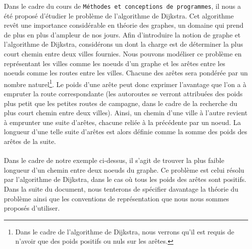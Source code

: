 
Dans le cadre du cours de \texttt{Méthodes et conceptions de programmes}, il nous a été proposé d'étudier le problème de l'algorithme de Dijkstra. Cet algorithme revêt une importance considérable en théorie des graphes, un domaine qui prend de plus en plus d'ampleur de nos jours. Afin d'introduire la notion de graphe et l'algorithme de Dijkstra, considérons un  dont la charge est de déterminer la plus court chemin entre deux villes fournies. Nous pouvons modéliser ce problème en représentant les villes comme les noeuds d'un graphe et les arêtes entre les noeuds comme les routes entre les villes. Chacune des arêtes sera pondérée par un nombre naturel\footnote{Dans le cadre de l'algorithme de Dijkstra, nous verrons qu'il est requis de n'avoir que des poids positifs ou nuls sur les arêtes.}. Le poids d'une arête peut donc exprimer l'avantage que l'on a à empruter la route correspondante (les autoroutes se verront attribuées des poids plus petit que les petites routes de campagne, dans le cadre de la recherche du plus court chemin entre deux villes). Ainsi, un chemin d'une ville à l'autre revient à emprunter une suite d'arêtes, chacune reliée à la précédente par un noeud. La longueur d'une telle suite d'arêtes est alors définie comme la somme des poids des arêtes de la suite.

\paragraph{}
Dans le cadre de notre exemple ci-dessus, il s'agit de trouver la plus faible longueur d'un chemin entre deux noeuds du graphe. Ce problème est celui résolu par l'algorithme de Dijkstra, dans le cas où tous les poids des arêtes sont positifs. Dans la suite du document, nous tenterons de spécifier davantage la théorie du problème ainsi que les conventions de représentation que nous nous sommes proposés d'utiliser.
